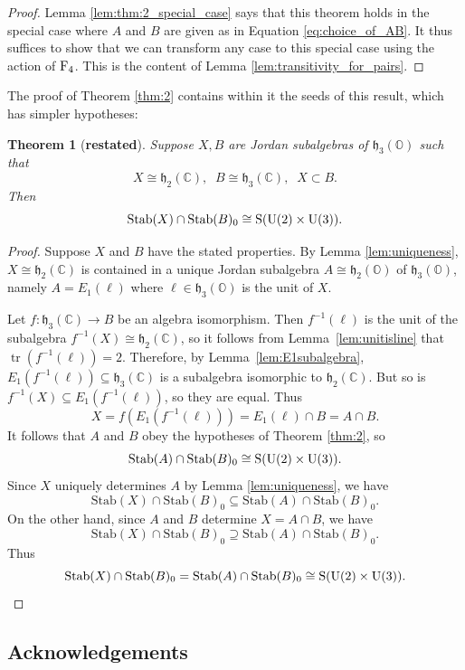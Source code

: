 \documentclass{article}
\theoremstyle{plain}
\newtheorem{thm}{Theorem}
\theoremstyle{remark}
\theoremstyle{definition}
\newcommand{\maps}{\colon}    %
\newcommand{\tr}{\operatorname{tr}}
\newcommand{\C}{{\mathbb C}}  %
\renewcommand{\O}{{\mathbb O}}  %
\newcommand{\U}{{\rm U}}    %
\newcommand{\F}{{\rm F}}       %
\newcommand{\Stab}{\mathrm{Stab}} %
\renewcommand{\S}{\mathrm{S}} %
\newcommand{\h}{\mathfrak{h}}  %
\begin{document}
\addtocounter{thm}{5}%
\begin{proof}
Lemma \ref{lem:thm:2_special_case} says that this theorem holds in the special case where $A$ and $B$ are given as in Equation \eqref{eq:choice_of_AB}.  It thus suffices to show that we can transform any case to this special case using the action of $\F_4$.  This is the content of Lemma \ref{lem:transitivity_for_pairs}.  
\end{proof}

The proof of Theorem \ref{thm:2} contains within it the seeds of this result, which has simpler hypotheses:

\addtocounter{thm}{-7}%
\begin{thm}[\textup{\textbf{restated}}]
Suppose $X,B$ are Jordan subalgebras of $\h_3(\O)$ such that
\[  X \cong \h_2(\C), \;\; B \cong \h_3(\C), \;\; X \subset B . \]
Then 
\[     \Stab(X) \cap \Stab(B)_0 \cong \S(\U(2) \times \U(3)). \]
\end{thm}  
\addtocounter{thm}{6}%

\begin{proof}
Suppose $X$ and $B$ have the stated properties.  By Lemma \ref{lem:uniqueness}, $X \cong \h_2(\C)$ is contained in a unique Jordan subalgebra $A \cong \h_2(\O)$ of $\h_3(\O)$, namely $A = E_1(\ell)$ where $\ell\in\h_3(\O)$ is the unit of $X$.

Let $f\maps\h_3(\C)\to B$ be an algebra isomorphism. Then $f^{-1}(\ell)$ is the unit of the subalgebra $f^{-1}(X)\cong\h_2(\C)$, so it follows from Lemma~\ref{lem:unitisline} that $\tr(f^{-1}(\ell))=2$. Therefore, by Lemma~\ref{lem:E1subalgebra}, $E_1(f^{-1}(\ell))\subseteq\h_3(\C)$ is a subalgebra isomorphic to $\h_2(\C)$. But so is $f^{-1}(X)\subseteq E_1(f^{-1}(\ell))$, so they are equal. Thus
\[X=f(E_1(f^{-1}(\ell)))=E_1(\ell)\cap B=A\cap B.\]
It follows that $A$ and $B$ obey the hypotheses of Theorem \ref{thm:2}, so 
\[   \Stab(A) \cap \Stab(B)_0 \cong \S(\U(2) \times \U(3)). \]
Since $X$ uniquely determines $A$ by Lemma \ref{lem:uniqueness}, we have
\[   \Stab(X) \cap \Stab(B)_0 \subseteq \Stab(A) \cap \Stab(B)_0 .\]
On the other hand, since $A$ and $B$ determine $X = A \cap B$, we have
\[   \Stab(X) \cap \Stab(B)_0 \supseteq \Stab(A) \cap \Stab(B)_0 .\]
Thus 
\[  \Stab(X) \cap \Stab(B)_0  = \Stab(A) \cap \Stab(B)_0 \cong \S(\U(2) \times \U(3)). \qedhere \]
\end{proof}




\subsection*{Acknowledgements}
\end{document}
